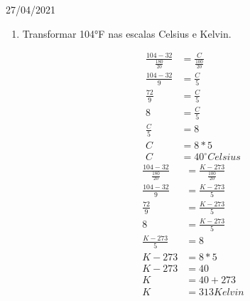 \documentclass{SchoolBook}
\begin{document}
\begin{day}{27/04/2021}
\begin{enumerate}
            \item[2.] Transformar 104°F nas escalas Celsius e Kelvin.
            \begin{multicols}{2}
                \begin{align*}
                    \frac{104 - 32}{\frac{180}{20}} &= \frac{C}{\frac{100}{20}} \\
                                 \frac{104 - 32}{9} &= \frac{C}{5}              \\
                                       \frac{72}{9} &= \frac{C}{5}              \\
                                                  8 &= \frac{C}{5}              \\
                                        \frac{C}{5} &= 8                        \\
                                                  C &= 8 * 5                    \\
                                                  C &= 40 ^\circ Celsius
                \end{align*}
                \begin{align*}
                    \frac{104 - 32}{\frac{180}{20}} &= \frac{K - 273}{\frac{100}{20}} \\
                                 \frac{104 - 32}{9} &= \frac{K - 273}{5}              \\
                                       \frac{72}{9} &= \frac{K - 273}{5}              \\
                                                  8 &= \frac{K - 273}{5}              \\
                                  \frac{K - 273}{5} &= 8                              \\
                                            K - 273 &= 8 * 5                          \\
                                            K - 273 &= 40                             \\
                                                  K &= 40 + 273                       \\
                                                  K &= 313 Kelvin
                \end{align*}
            \end{multicols}
            

\end{enumerate}
\end{day}
\end{document}
